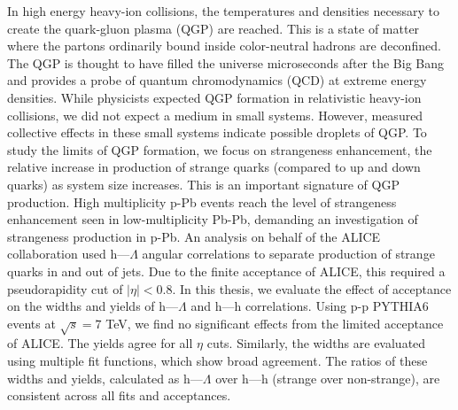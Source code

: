 \documentclass[../main.tex]{subfiles}
\begin{document}
In high energy heavy-ion collisions, the temperatures and densities necessary to create the quark-gluon plasma (QGP) are reached. This is a state of matter where the partons ordinarily bound inside color-neutral hadrons are deconfined. The QGP is thought to have filled the universe microseconds after the Big Bang and provides a probe of quantum chromodynamics (QCD) at extreme energy densities. While physicists expected QGP formation in relativistic heavy-ion collisions, we did not expect a medium in small systems. However, measured collective effects in these small systems indicate possible droplets of QGP. To study the limits of QGP formation, we focus on strangeness enhancement, the relative increase in production of strange quarks (compared to up and down quarks) as system size increases. This is an important signature of QGP production. High multiplicity p-Pb events reach the level of strangeness enhancement seen in low-multiplicity Pb-Pb, demanding an investigation of strangeness production in p-Pb. An analysis on behalf of the ALICE collaboration used h---$\Lambda$ angular correlations to separate production of strange quarks in and out of jets. Due to the finite acceptance of ALICE, this required a pseudorapidity cut of $|\eta|<0.8$. In this thesis, we evaluate the effect of acceptance on the widths and yields of h---$\Lambda$ and h---h correlations. Using p-p PYTHIA6 events at $\sqrt{s}=7$ TeV, we find no significant effects from the limited acceptance of ALICE. The yields agree for all $\eta$ cuts. Similarly, the widths are evaluated using multiple fit functions, which show broad agreement. The ratios of these widths and yields, calculated as h---$\Lambda$ over h---h (strange over non-strange), are consistent across all fits and acceptances. 
\end{document}
